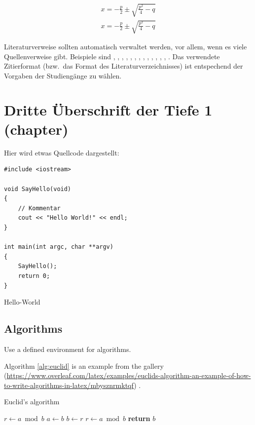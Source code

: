 \documentclass[Master,BMR,german]{BASE/twbook}
\begin{document}
\begin{align}
x = -\frac{p}{2}\pm\sqrt{\frac{p^2}{4}-q}\label{Gl1}
\end{align}
\begin{align}
x = -\frac{p}{2}\pm\sqrt{\frac{p^2}{4}-q}\label{Gl2}
\end{align}

Literaturverweise sollten automatisch verwaltet werden, vor allem, wenn es viele Quellenverweise gibt. Beispiele sind  \cite{Ko05a}, \cite{Ko05b}, \cite{MiGo05}, \cite{TeGo14}, \cite{HuHa07}, \cite{HuZi10}, \cite{ZiKu07}, \cite{He07}, \cite{SIE11}, \cite{SIE14}, \cite{ISO98}, \cite{ATM11}, \cite{Hu11}, \cite{Po10}. Das verwendete Zitierformat (bzw.~das Format des Literaturverzeichnisses) ist entspechend der Vorgaben der Studiengänge zu wählen.
\chapter{Dritte Überschrift der Tiefe 1 (chapter)}
Hier wird etwas Quellcode dargestellt:
\begin{listing}[htbp]
\begin{verbatim}
#include <iostream>

void SayHello(void)
{
    // Kommentar
    cout << "Hello World!" << endl;
}

int main(int argc, char **argv)
{
    SayHello();
    return 0;
}
\end{verbatim}
\caption{Hello-World}
\end{listing}


\section{Algorithms}


Use a defined environment for algorithms.

Algorithm \ref{alg:euclid} is an example from the gallery (\url{https://www.overleaf.com/latex/examples/euclids-algorithm-an-example-of-how-to-write-algorithms-in-latex/mbysznrmktqf}) .
\begin{algorithm}
\caption{Euclid’s algorithm}\label{alg:euclid}
\begin{algorithmic}[1]
\State $r\gets a\bmod b$
\State $a\gets b$
\State $b\gets r$
\State $r\gets a\bmod b$
\EndWhile\label{euclidendwhile}
\State \textbf{return} $b$
\EndProcedure
\end{algorithmic}
\end{algorithm}
\clearpage                                                       %
\end{document}
